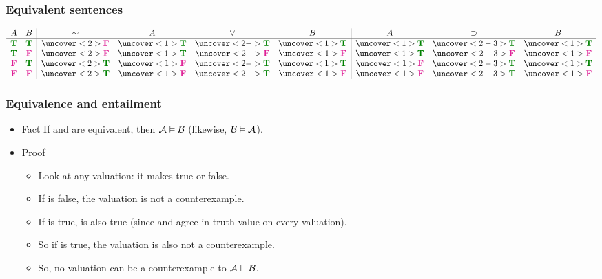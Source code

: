 \begin{frame}
\frametitle{Equivalent sentences}


\[\begin{array}{cc|cccc|cccc}
A & B & \enot & A & \eor & B & A & \eif & B\\
\hline
\True & \True & \uncover<2>{\False} & \uncover<1>{\True} &
\uncover<2->{\True} & \uncover<1>{\True} & \uncover<1>{\True} &
\uncover<2-3>{\True} & \uncover<1>{\True} \\
\True & \False & \uncover<2>{\False} & \uncover<1>{\True} &
\uncover<2->{\False} & \uncover<1>{\False} & \uncover<1>{\True} &
\uncover<2-3>{\False} & \uncover<1>{\False} \\
\False & \True & \uncover<2>{\True} & \uncover<1>{\False} &
\uncover<2->{\True} & \uncover<1>{\True} & \uncover<1>{\False} &
\uncover<2-3>{\True} & \uncover<1>{\True} \\
\False & \False & \uncover<2>{\True} & \uncover<1>{\False} &
\uncover<2->{\True} & \uncover<1>{\False} & \uncover<1>{\False} &
\uncover<2-3>{\True} & \uncover<1>{\False}
\end{array}
\]

\end{frame}


\begin{frame}
\frametitle{Equivalence and entailment}

\begin{itemize}[<+->]
\item[]\begin{block}{Fact}
If  and  are equivalent, then $\mathcal{A} \vDash
\mathcal{B}$ (likewise, $\mathcal{B} \vDash \mathcal{A}$).
\end{block}

\item[]\begin{block}{Proof}
\begin{itemize}[<+->]
  \item Look at any valuation: it makes  true or false.
  \item If  is false, the valuation is not a counterexample.
  \item If  is true,  is also true (since 
  and  agree in truth value on every valuation).
  \item So if  is true, the valuation is also not a counterexample.
  \item So, no valuation can be a counterexample to $\mathcal{A} \vDash \mathcal{B}$.
\end{itemize}
\end{block}
\end{itemize}
\end{frame}

